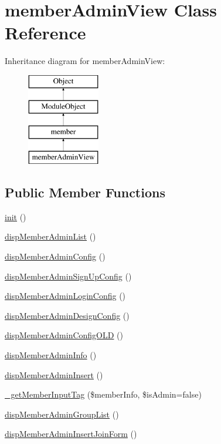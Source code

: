 \hypertarget{classmemberAdminView}{}\section{member\+Admin\+View Class Reference}
\label{classmemberAdminView}
Inheritance diagram for member\+Admin\+View\+:\begin{figure}[H]
\begin{center}
\leavevmode
\includegraphics[height=4.000000cm]{classmemberAdminView}
\end{center}
\end{figure}
\subsection*{Public Member Functions}
\begin{DoxyCompactItemize}
\item 
\hyperlink{classmemberAdminView_abfcff5343cc06cfa70fa1994b8a77d05}{init} ()
\item 
\hyperlink{classmemberAdminView_ab234e23e8317000c0f1722ab0f54ab99}{disp\+Member\+Admin\+List} ()
\item 
\hyperlink{classmemberAdminView_a8b5394bc1e9e1aae78bfaccad8e0edc9}{disp\+Member\+Admin\+Config} ()
\item 
\hyperlink{classmemberAdminView_af3ab8ea3d555e7e685c6c4706e3ea545}{disp\+Member\+Admin\+Sign\+Up\+Config} ()
\item 
\hyperlink{classmemberAdminView_a98debda6b76587e3633453e68c58a955}{disp\+Member\+Admin\+Login\+Config} ()
\item 
\hyperlink{classmemberAdminView_ab9f3ed7d905d09ea8ad49acdc22fe326}{disp\+Member\+Admin\+Design\+Config} ()
\item 
\hyperlink{classmemberAdminView_ad609a62a6d1aa8ec0c33fb6e30e20f08}{disp\+Member\+Admin\+Config\+O\+L\+D} ()
\item 
\hyperlink{classmemberAdminView_a9e87c4fbbb859f2557457b1935453dd4}{disp\+Member\+Admin\+Info} ()
\item 
\hyperlink{classmemberAdminView_ad7a3311686a49ab70e318fb66736258a}{disp\+Member\+Admin\+Insert} ()
\item 
\hyperlink{classmemberAdminView_a49f5bc2cf86576c040abfb686c21383b}{\+\_\+get\+Member\+Input\+Tag} (\$member\+Info, \$is\+Admin=false)
\item 
\hyperlink{classmemberAdminView_a4a1e4b416515bdcdb1459f44398eb412}{disp\+Member\+Admin\+Group\+List} ()
\item 
\hyperlink{classmemberAdminView_a049d24f5adc0c5eb534902e44944ff08}{disp\+Member\+Admin\+Insert\+Join\+Form} ()
\end{DoxyCompactItemize}

